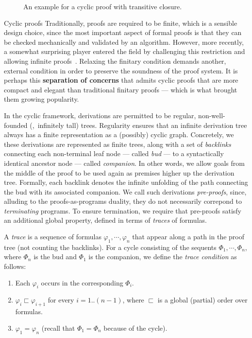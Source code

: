 \begin{figure}

\caption{An example for a cyclic proof with transitive closure.}
\label{b2:tc-cyclic-example}
\end{figure}

\begin{paragraph}{Cyclic proofs}
Traditionally, proofs are required to be finite, which is a sensible design choice, since the most important aspect of formal proofs is that they can be checked mechanically and validated by an algorithm.
However, more recently, a somewhat surprising player entered the field by challenging this restriction and allowing infinite proofs~\cite{LICS2007:Brotherston}.
Relaxing the finitary condition demands another, external condition in order to preserve the soundness of the proof system.
It is perhaps this \textbf{separation of concerns} that admits cyclic proofs that are more compact and elegant than traditional finitary proofs --- which is what brought them growing popularity.

In the cyclic framework, derivations are permitted to be regular,
non-well-founded (\ie,~infinitely tall) trees.
Regularity ensures that an infinite derivation tree always has a finite representation
as a (possibly) cyclic graph.
Concretely, we these derivations are represented as finite trees, 
along with a set of \emph{backlinks} connecting each
non-terminal leaf node --- called \emph{bud} ---
to a syntactically identical ancestor node --- called \emph{companion}.
In other words, we allow goals from the middle of the proof to be
used again as premises higher up the derivation tree.
Formally, each backlink denotes the infinite unfolding of the
path connecting the bud with its associated companion.
We call such derivations \emph{pre-proofs}, since, alluding to the proofs-as-programs duality, they do not necessarily correpond to \emph{terminating} programs.
To ensure termination, we require that pre-proofs satisfy
an additional global property, defined in terms of \emph{traces} of formulas.

A \emph{trace} is a sequence of formulas $\varphi_1, {\cdots}, \varphi_n$ that appear along a path in the proof tree (not counting the backlinks).
For a cycle consisting of the sequents $\Phi_1,{\cdots},\Phi_n$, where $\Phi_n$ is the bud and $\Phi_1$ is the companion, we define the \emph{trace condition} as follows:
\begin{enumerate}
 \item Each $\varphi_i$ occurs in the corresponding $\Phi_i$.
 \item $\varphi_i \sqsubset \varphi_{i+1}$ for every $i=1..(n-1)$, where $\sqsubset$ is a global (partial) order over formulas.
 \item $\varphi_1 = \varphi_n$ (recall that $\Phi_1 = \Phi_n$ because of the cycle).
\end{enumerate}
\end{paragraph}


